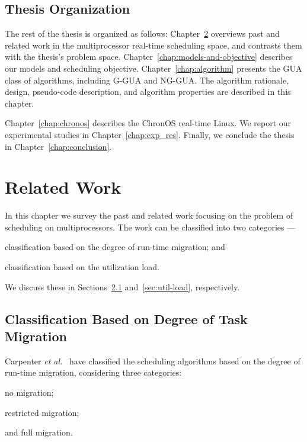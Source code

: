 \documentclass[12pt,dvips]{report}
\begin{document}
\section{Thesis Organization}

The rest of the thesis is organized as follows: Chapter~\ref{chap:related-work} overviews past and related work in the multiprocessor real-time scheduling space, and contrasts them with the thesis's problem space. Chapter~\ref{chap:models-and-objective} describes our models and scheduling objective. Chapter~\ref{chap:algorithm} presents the GUA class of algorithms, including G-GUA and NG-GUA. The algorithm rationale, design, pseudo-code description, and algorithm properties are described in this chapter.

Chapter~\ref{chap:chronos} describes the ChronOS real-time Linux. We report our experimental studies in Chapter~\ref{chap:exp_res}. Finally, we conclude the thesis in Chapter~\ref{chap:conclusion}.









\chapter{Related Work}\label{chap:related-work}

In this chapter we survey the past and related work focusing on the problem of scheduling on multiprocessors. The work can be classified into two categories ---
\begin{inparaenum}[(i)]
\item classification based on the degree of run-time migration; and 
\item classification based on the utilization load.
\end{inparaenum}
We discuss these in Sections~\ref{sec:task-migration} and~\ref{sec:util-load}, respectively.

\section{Classification Based on Degree of Task Migration} \label{sec:task-migration}
Carpenter \textit{et al.}~\cite{Carpenter04acategorization} have classified the scheduling algorithms based on the degree of run-time migration, considering three categories:
\begin{inparaenum}[(i)]
	\item no migration;
	\item restricted migration;
	\item and full migration. 
\end{inparaenum}
\end{document}
